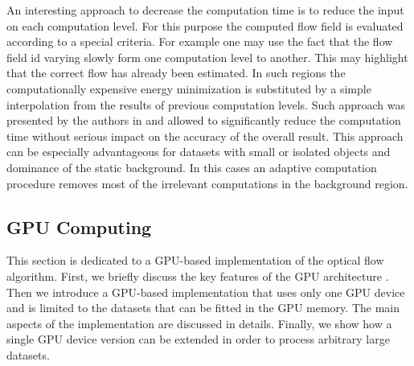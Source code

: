 An interesting approach to decrease the computation time is to reduce the input on each computation level. For this purpose the computed flow field is evaluated according to a special criteria. For example one may use the fact that the flow field id varying slowly form one computation level to another. This may highlight that the correct flow has already been estimated. In such regions the computationally expensive energy minimization is substituted by a simple interpolation from the results of previous computation levels. Such approach was presented by the authors in \cite{CGF3013} and allowed to significantly reduce the computation time without serious impact on the accuracy of the overall result. This approach can be especially advantageous for datasets with small or isolated objects and dominance of the static background. In this cases an adaptive computation procedure removes most of the irrelevant computations in the background region.    


%
%



\subsection{GPU Computing}   
\label{gpu} 


This section is dedicated to a GPU-based implementation of the optical flow algorithm. First, we briefly discuss the key features of the GPU architecture \cite{nvidiatoolkit, nvidia2010developer}. Then we introduce a GPU-based implementation that uses only one GPU device and is limited to the datasets that can be fitted in the GPU memory. The main aspects of the implementation are discussed in details. Finally, we show how a single GPU device version can be extended in order to process arbitrary large datasets.


